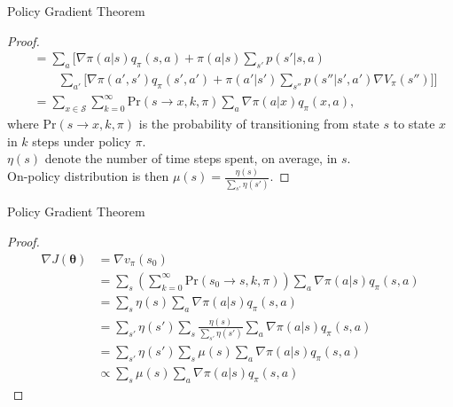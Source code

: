 \documentclass{beamer}
\begin{document}
\begin{frame}{Policy Gradient Theorem}
\begin{proof}
\vspace*{-0.8cm}
\renewcommand{\qedsymbol}{}
\begin{align}
&= \sum_a \Big[ \nabla \pi(a|s) q_{\pi}(s,a) +  \pi(a|s) \sum_{s'} p(s'|s,a) \nonumber\\
& \qquad  \sum_{a'} \Big[ \nabla\pi(a',s')q_{\pi}(s',a') + \pi(a'|s') \sum_{s''}p(s''|s',a')\nabla V_{\pi}(s'') \Big]\Big]\\
&= \sum_{x \in \mathcal{S}} \sum_{k=0}^{\infty} \mathrm{Pr}(s \to x, k, \pi) \sum_a \nabla \pi(a|x) q_{\pi}(x,a),
\end{align}
where  $\mathrm{Pr}(s \to x, k, \pi)$ is the probability of transitioning from state $s$ to state $x$ in $k$ steps under policy $\pi$.\\
$\eta(s)$ denote the number of time steps spent, on average, in $s$.\\
On-policy distribution is then $\mu(s) = \frac{\eta(s)}{\sum_{s'}\eta(s')}$.
\end{proof}
\end{frame}

\begin{frame}{Policy Gradient Theorem}

\begin{proof}
\vspace*{-0.8cm}
\begin{align}
\nabla J(\boldsymbol{\theta}) &= \nabla v_{\pi}(s_0)\\
&= \sum_s \left(\sum_{k=0}^{\infty} \mathrm{Pr}(s_0 \to s, k, \pi) \right) \sum_a \nabla \pi (a|s) q_{\pi}(s,a)\\
&= \sum_s \eta(s) \sum_a \nabla \pi (a|s) q_{\pi}(s,a)\\
&= \sum_{s'} \eta(s') \sum_s\frac{\eta(s)}{\sum_{s'} \eta(s')}  \sum_a \nabla \pi (a|s) q_{\pi}(s,a)\\
&= \sum_{s'} \eta(s') \sum_s \mu(s) \sum_a \nabla \pi (a|s) q_{\pi}(s,a)\\
& \propto \sum_s \mu(s)  \sum_a \nabla \pi (a|s) q_{\pi}(s,a)
\end{align}
\end{proof}

\end{frame}
\end{document}
